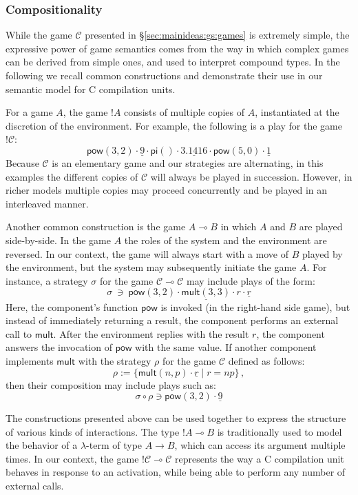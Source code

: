 \documentclass[acmsmall,timestamp,review,anonymous]{acmart}
\newcommand{\kw}[1]{\ensuremath{ \mathsf{#1} }}
\begin{document}

\subsubsection{Compositionality} \label{sec:mainideas:gs:comp} %

While the game $\mathcal{C}$
presented in \S\ref{sec:mainideas:gs:games}
is extremely simple,
the expressive power of game semantics
comes from the way in which complex games can be derived from simple ones,
and used to interpret compound types.
In the following we recall common constructions
and demonstrate their use
in our semantic model for C compilation units.

For a game $A$,
the game $!A$ consists of multiple copies of $A$,
instantiated at the discretion of the environment.
For example,
the following is a play for the game $!\mathcal{C}$:
\[
    \kw{pow}(3,2) \cdot
    \underline{9} \cdot
    \kw{pi}() \cdot
    \underline{3.1416} \cdot
    \kw{pow}(5,0) \cdot
    \underline{1}
\]
Because $\mathcal{C}$ is an elementary game
and our strategies are alternating,
in this examples the different copies of $\mathcal{C}$
will always be played in succession.
However,
in richer models multiple copies may proceed
concurrently
and be played in an interleaved manner.

Another common construction is the game $A \multimap B$
in which $A$ and $B$ are played side-by-side.
In the game $A$ the roles of the system and the environment
are reversed.
In our context,
the game will always start
with a move of $B$ played by the environment,
but the system may subsequently initiate the game $A$.
For instance, a strategy $\sigma$
for the game $\mathcal{C} \multimap \mathcal{C}$
may include plays of the form:
\[
    \sigma \: \ni \:
    \kw{pow}(3,2) \cdot
    \underline{\kw{mult}(3,3)} \cdot
    r \cdot
    \underline{r}
\]
Here,
the component's function $\kw{pow}$
is invoked (in the right-hand side game),
but instead of immediately returning a result,
the component performs an external call to $\kw{mult}$.
After the environment replies with the result $r$,
the component answers the invocation of $\kw{pow}$
with the same value.
If another component implements $\kw{mult}$
with the strategy $\rho$
for the game $\mathcal{C}$ defined as follows:
\[ \rho := \{ \kw{mult}(n,p) \cdot \underline{r} \mid r = n p \} \,, \]
then their composition may include plays such as:
\[ \sigma \circ \rho \ni \kw{pow}(3,2) \cdot \underline{9} \]

The constructions presented above can be used together
to express the structure of various kinds of interactions.
The type $!A \multimap B$ is traditionally used
to model the behavior of a $\lambda$-term of type $A \rightarrow B$,
which can access its argument multiple times.
In our context,
the game $!\mathcal{C} \multimap \mathcal{C}$
represents the way a C compilation unit behaves in response to
an activation,
while being able to perform any number of external calls.
\end{document}
